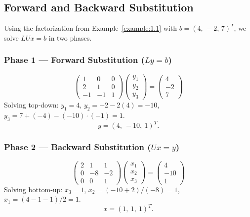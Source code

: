 \documentclass[11pt, a4paper]{article}
\begin{document}
\subsection{Forward and Backward Substitution}

\begin{example}[Solving $Ax=b$ via LU]
Using the factorization from Example~\ref{example:1.1} with $b = (4,\,-2,\,7)^T$, we solve $LUx = b$ in two phases.

\subsubsection*{Phase 1 — Forward Substitution ($Ly = b$)}
\[
\begin{pmatrix} 1 & 0 & 0 \\ 2 & 1 & 0 \\ -1 & -1 & 1 \end{pmatrix}
\begin{pmatrix} y_1 \\ y_2 \\ y_3 \end{pmatrix}
=
\begin{pmatrix} 4 \\ -2 \\ 7 \end{pmatrix}
\]
Solving top-down: $y_1 = 4$, $y_2 = -2 - 2(4) = -10$, $y_3 = 7 + (-4) - (-10) \cdot (-1) = 1$.
\[
y = (4,\ -10,\ 1)^T.
\]

\subsubsection*{Phase 2 — Backward Substitution ($Ux = y$)}
\[
\begin{pmatrix} 2 & 1 & 1 \\ 0 & -8 & -2 \\ 0 & 0 & 1 \end{pmatrix}
\begin{pmatrix} x_1 \\ x_2 \\ x_3 \end{pmatrix}
=
\begin{pmatrix} 4 \\ -10 \\ 1 \end{pmatrix}
\]
Solving bottom-up: $x_3 = 1$, $x_2 = (-10 + 2)/(-8) = 1$, $x_1 = (4 - 1 - 1)/2 = 1$.
\[
\boxed{x = (1,\ 1,\ 1)^T.}
\]
\end{example}
\end{document}
